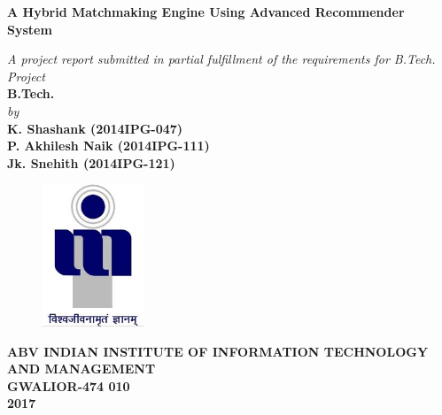 \documentclass[12pt,oneside]{book}
\title{}
\author{}
\begin{document}
\begin{titlepage}
\begin{center}
{\LARGE \bf A Hybrid Matchmaking Engine Using Advanced Recommender System } \\
\end{center}
\begin{center}
\vspace{0.6in}
{\large \it A project report submitted in partial fulfillment of the requirements for B.Tech. Project} \\
\vspace{0.6in}
{\large \bf B.Tech.} \\
\vspace{0.5in}
{\large \it by\\}
\vspace{0.3in}
{\large \bf  K. Shashank (2014IPG-047)}\\
{\large \bf  P. Akhilesh Naik (2014IPG-111)}\\
{\large \bf Jk. Snehith (2014IPG-121)}\\
\end {center}
\vspace{0.8in}
\begin{figure}[h]
\centerline{\includegraphics[width=1.2in]{dwd.jpg}}
\end{figure}
\begin{center}
{\Large \bf ABV INDIAN INSTITUTE OF INFORMATION TECHNOLOGY AND MANAGEMENT\\
GWALIOR-474 010\\}
\vspace{0.2in}
{\Large \bf 2017\\}
\end{center}
\end{titlepage}
\end{document}
